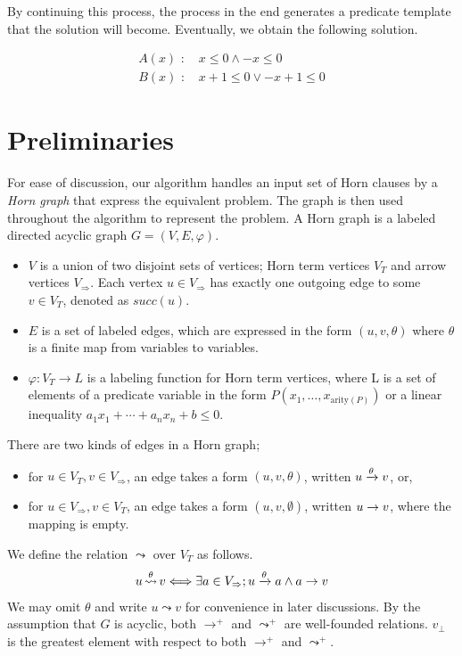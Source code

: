 By continuing this process, the process in the end generates a
predicate template that the solution will become.  Eventually, we
obtain the following solution.

\begin{align*}
A(x) \text{ : } & x \leq 0 \wedge -x \leq 0 \\
B(x) \text{ : } & x+1 \leq 0 \vee -x+1 \leq 0
\end{align*}

\section{Preliminaries}

For ease of discussion, our algorithm handles an input set of Horn
clauses by a \emph{Horn graph} that express the equivalent problem.
The graph is then used throughout the algorithm to represent the
problem.  A Horn graph is a labeled directed acyclic graph
$G=(V,E,\varphi)$.
\begin{itemize}
\item $V$ is a union of two disjoint sets of vertices; Horn term
  vertices $V_T$ and arrow vertices $V_\Rightarrow$.  Each vertex
  $u \in V_\Rightarrow$ has exactly one outgoing edge to some
  $v \in V_T$, denoted as $succ(u)$.
\item $E$ is a set of labeled edges, which are expressed in the form
  $(u,v,\theta)$ where $\theta$ is a finite map from variables to
  variables.
\item $\varphi: V_T \rightarrow L$ is a labeling function for Horn
  term vertices, where L is a set of elements of a predicate variable
  in the form $P(x_1, \ldots, x_{\mathrm{arity}(P)})$ or a linear
  inequality $a_1 x_1 + \cdots + a_n x_n + b \leq 0$.
\end{itemize}
There are two kinds of edges in a Horn graph;
\begin{itemize}
\item for $u \in V_T, v \in V_\Rightarrow$, an edge takes a form
  $(u,v,\theta)$, written $u\xrightarrow{\theta}v$, or,
\item for $u \in V_\Rightarrow, v \in V_T$, an edge takes a form
  $(u,v,\emptyset)$, written $u\rightarrow v$, where the mapping is
  empty.
\end{itemize}

We define the relation $\leadsto$ over $V_T$ as follows.
\[ u \mathop{\leadsto}^\theta v \Longleftrightarrow \exists a \in V_\Rightarrow;
u\xrightarrow{\theta}a \wedge a\rightarrow v \]
We may omit $\theta$ and write $u \leadsto v$ for convenience in later
discussions. By the assumption that $G$ is acyclic, both
$\rightarrow^+$ and $\leadsto^+$ are well-founded relations. $v_\bot$
is the greatest element with respect to both $\rightarrow^+$ and
$\leadsto^+$.

